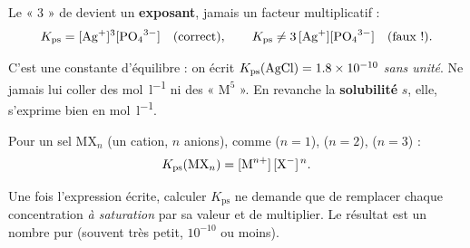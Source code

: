 \documentclass[11pt,a4paper]{article}
\begin{document}
\begin{piege}[coefficient = exposant, pas facteur]
Le « 3 » de  devient un \textbf{exposant}, jamais un facteur multiplicatif :
\[ K_{\mathrm{ps}} = [\ce{Ag+}]^{3}[\ce{PO4^{3-}}] \quad\text{(correct)}, \qquad
   K_{\mathrm{ps}} \neq 3\,[\ce{Ag+}][\ce{PO4^{3-}}] \quad\text{(faux !)}. \]
\end{piege}

\begin{piege}
C'est une constante d'équilibre : on écrit $K_{\mathrm{ps}}(\ce{AgCl})=\num{1.8e-10}$ \emph{sans unité}.
Ne jamais lui coller des \si{\mole\per\litre} ni des « $\mathrm{M}^5$ ». En revanche la
\textbf{solubilité} $s$, elle, s'exprime bien en \si{\mole\per\litre}.
\end{piege}

\begin{cle}
Pour un sel $\mathrm{MX}_n$ (un cation, $n$ anions), comme  ($n=1$),  ($n=2$),
 ($n=3$) :
\[ K_{\mathrm{ps}}(\mathrm{MX}_n) = [\ce{M^{n+}}]\,[\ce{X^{-}}]^{\,n}. \]
\end{cle}

\begin{remarque}
Une fois l'expression écrite, calculer $K_{\mathrm{ps}}$ ne demande que de remplacer chaque
concentration \emph{à saturation} par sa valeur et de multiplier. Le résultat est un nombre pur (souvent
très petit, $10^{-10}$ ou moins).
\end{remarque}
\end{document}
